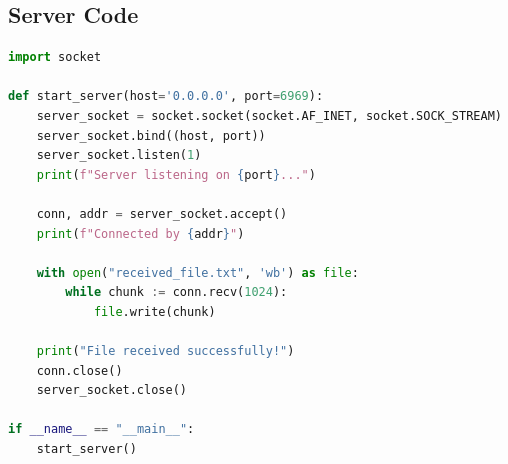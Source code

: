\documentclass[12pt]{article}
\begin{document}
\subsection{Server Code}
\begin{lstlisting}[language=Python, caption=Server code: start\_server()]
import socket

def start_server(host='0.0.0.0', port=6969):
    server_socket = socket.socket(socket.AF_INET, socket.SOCK_STREAM)
    server_socket.bind((host, port))
    server_socket.listen(1)
    print(f"Server listening on {port}...")
    
    conn, addr = server_socket.accept()
    print(f"Connected by {addr}")
    
    with open("received_file.txt", 'wb') as file:
        while chunk := conn.recv(1024):
            file.write(chunk)
    
    print("File received successfully!")
    conn.close()
    server_socket.close()

if __name__ == "__main__":
    start_server()
\end{lstlisting}
\end{document}
